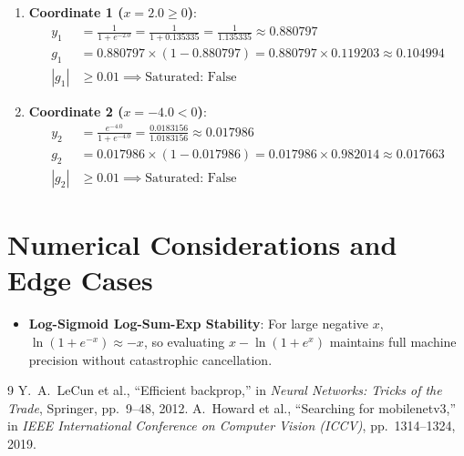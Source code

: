 \documentclass[11pt,a4paper]{article}
\theoremstyle{definition}
\begin{document}
\begin{enumerate}
    \item \textbf{Coordinate 1 ($x=2.0 \ge 0$)}:
    \begin{align}
    y_1 &= \frac{1}{1 + e^{-2.0}} = \frac{1}{1 + 0.135335} = \frac{1}{1.135335} \approx 0.880797 \\
    g_1 &= 0.880797 \times (1 - 0.880797) = 0.880797 \times 0.119203 \approx 0.104994 \\
    |g_1| &\ge 0.01 \implies \text{Saturated: False}
    \end{align}
    \item \textbf{Coordinate 2 ($x=-4.0 < 0$)}:
    \begin{align}
    y_2 &= \frac{e^{-4.0}}{1 + e^{-4.0}} = \frac{0.0183156}{1.0183156} \approx 0.017986 \\
    g_2 &= 0.017986 \times (1 - 0.017986) = 0.017986 \times 0.982014 \approx 0.017663 \\
    |g_2| &\ge 0.01 \implies \text{Saturated: False}
    \end{align}
\end{enumerate}

\section{Numerical Considerations and Edge Cases}

\begin{itemize}
    \item \textbf{Log-Sigmoid Log-Sum-Exp Stability}: For large negative $x$, $\ln(1 + e^{-x}) \approx -x$, so evaluating $x - \ln(1 + e^x)$ maintains full machine precision without catastrophic cancellation.
\end{itemize}

\begin{thebibliography}{9}
 Y.~A.~LeCun et al., ``Efficient backprop,'' in \emph{Neural Networks: Tricks of the Trade}, Springer, pp.~9--48, 2012.
 A.~Howard et al., ``Searching for mobilenetv3,'' in \emph{IEEE International Conference on Computer Vision (ICCV)}, pp.~1314--1324, 2019.
\end{thebibliography}
\end{document}
